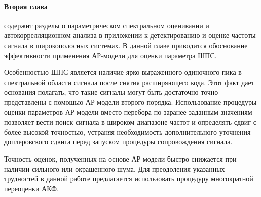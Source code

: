\paragraph{Вторая глава} содержит разделы о параметрическом спектральном оценивании и автокоррелляционном анализа в приложении к детектированию и оценке
частоты сигнала в широкополосных системах. В данной главе приводится обоснование эффективности применения АР-модели для оценки параметра ШПС.

Особенностью ШПС является наличие ярко выраженного одиночного пика в спектральной области сигнала после снятия расширяющего кода. 
Этот факт дает основания полагать, что такие сигналы могут быть достаточно точно представлены с помощью АР модели второго порядка.
Использование процедуры оценки параметров АР модели вместо перебора по заранее заданным значениям позволяет вести поиск сигнала
в широком диапазоне частот и определять сдвиг с более высокой точностью, устраняя необходимость дополнительного уточнения
доплеровского сдвига перед запуском процедуры сопровождения сигнала.

Точность оценок, полученных на основе АР модели быстро снижается при наличии сильного или окрашенного шума. Для преодоления указанных
трудностей в данной работе предлагается использовать процедуру многократной переоценки АКФ. 
